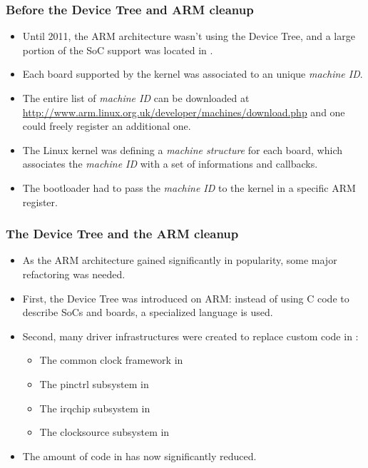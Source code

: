 \begin{frame}
  \frametitle{Before the Device Tree and ARM cleanup}
  \begin{itemize}
  \item Until 2011, the ARM architecture wasn't using the Device Tree,
    and a large portion of the SoC support was located in
    .
  \item Each board supported by the kernel was associated to an unique
    {\em machine ID}.
  \item The entire list of {\em machine ID} can be downloaded at
    \url{http://www.arm.linux.org.uk/developer/machines/download.php}
    and one could freely register an additional one.
  \item The Linux kernel was defining a {\em machine structure} for
    each board, which associates the {\em machine ID} with a set of
    informations and callbacks.
  \item The bootloader had to pass the {\em machine ID} to the kernel
    in a specific ARM register.
  \end{itemize}
\end{frame}

\begin{frame}
  \frametitle{The Device Tree and the ARM cleanup}
  \begin{itemize}
  \item As the ARM architecture gained significantly in popularity,
    some major refactoring was needed.
  \item First, the Device Tree was introduced on ARM: instead of using
    C code to describe SoCs and boards, a specialized language is
    used.
  \item Second, many driver infrastructures were created to replace
    custom code in :
    \begin{itemize}
    \item The common clock framework in 
    \item The pinctrl subsystem in 
    \item The irqchip subsystem in 
    \item The clocksource subsystem in 
    \end{itemize}
  \item The amount of code in  has now significantly
    reduced.
  \end{itemize}
\end{frame}

